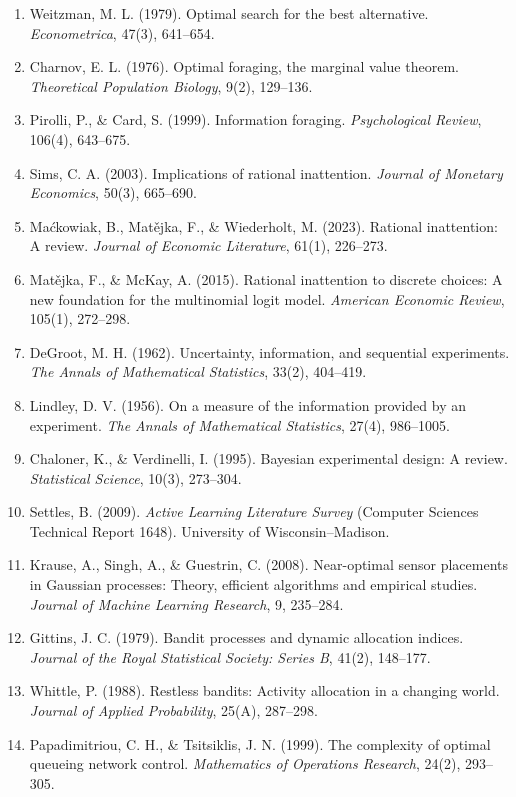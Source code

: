 \documentclass[
  11pt]{article}
\begin{document}
\begin{enumerate}
\item
  Weitzman, M. L. (1979). Optimal search for the best alternative. \emph{Econometrica}, 47(3), 641--654.
\item
  Charnov, E. L. (1976). Optimal foraging, the marginal value theorem. \emph{Theoretical Population Biology}, 9(2), 129--136.
\item
  Pirolli, P., \& Card, S. (1999). Information foraging. \emph{Psychological Review}, 106(4), 643--675.
\item
  Sims, C. A. (2003). Implications of rational inattention. \emph{Journal of Monetary Economics}, 50(3), 665--690.
\item
  Maćkowiak, B., Matějka, F., \& Wiederholt, M. (2023). Rational inattention: A review. \emph{Journal of Economic Literature}, 61(1), 226--273.
\item
  Matějka, F., \& McKay, A. (2015). Rational inattention to discrete choices: A new foundation for the multinomial logit model. \emph{American Economic Review}, 105(1), 272--298.
\item
  DeGroot, M. H. (1962). Uncertainty, information, and sequential experiments. \emph{The Annals of Mathematical Statistics}, 33(2), 404--419.
\item
  Lindley, D. V. (1956). On a measure of the information provided by an experiment. \emph{The Annals of Mathematical Statistics}, 27(4), 986--1005.
\item
  Chaloner, K., \& Verdinelli, I. (1995). Bayesian experimental design: A review. \emph{Statistical Science}, 10(3), 273--304.
\item
  Settles, B. (2009). \emph{Active Learning Literature Survey} (Computer Sciences Technical Report 1648). University of Wisconsin--Madison.
\item
  Krause, A., Singh, A., \& Guestrin, C. (2008). Near-optimal sensor placements in Gaussian processes: Theory, efficient algorithms and empirical studies. \emph{Journal of Machine Learning Research}, 9, 235--284.
\item
  Gittins, J. C. (1979). Bandit processes and dynamic allocation indices. \emph{Journal of the Royal Statistical Society: Series B}, 41(2), 148--177.
\item
  Whittle, P. (1988). Restless bandits: Activity allocation in a changing world. \emph{Journal of Applied Probability}, 25(A), 287--298.
\item
  Papadimitriou, C. H., \& Tsitsiklis, J. N. (1999). The complexity of optimal queueing network control. \emph{Mathematics of Operations Research}, 24(2), 293--305.

\end{enumerate}
\end{document}
